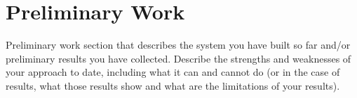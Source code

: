 \section{Preliminary Work}
Preliminary work section that describes the system you have built so
far and/or preliminary results you have collected. Describe the
strengths and weaknesses of your approach to date, including what it can
and cannot do (or in the case of results, what those results show and
what are the limitations of your results).